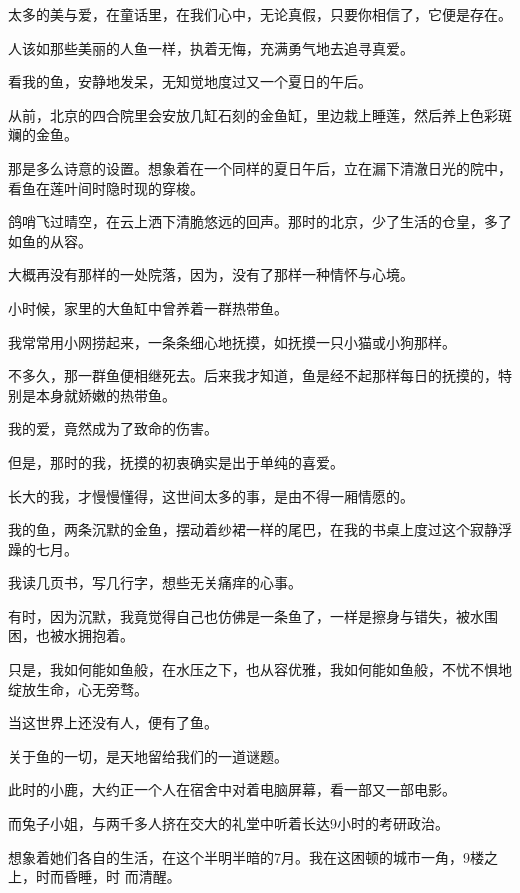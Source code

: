 \documentclass[12pt,a4paper]{article}
\def\blankrev{\vspace{1ex}}									%
\begin{document}
		\blankrev
		太多的美与爱，在童话里，在我们心中，无论真假，只要你相信了，它便是存在。\par
		人该如那些美丽的人鱼一样，执着无悔，充满勇气地去追寻真爱。

		\blankrev
		看我的鱼，安静地发呆，无知觉地度过又一个夏日的午后。\par
		从前，北京的四合院里会安放几缸石刻的金鱼缸，里边栽上睡莲，然后养上色彩斑斓的金鱼。\par
		那是多么诗意的设置。想象着在一个同样的夏日午后，立在漏下清澈日光的院中，看鱼在莲叶间时隐时现的穿梭。\par
		鸽哨飞过晴空，在云上洒下清脆悠远的回声。那时的北京，少了生活的仓皇，多了如鱼的从容。\par
		大概再没有那样的一处院落，因为，没有了那样一种情怀与心境。

		\blankrev
		小时候，家里的大鱼缸中曾养着一群热带鱼。\par
		我常常用小网捞起来，一条条细心地抚摸，如抚摸一只小猫或小狗那样。\par
		不多久，那一群鱼便相继死去。后来我才知道，鱼是经不起那样每日的抚摸的，特别是本身就娇嫩的热带鱼。

		\blankrev
		我的爱，竟然成为了致命的伤害。\par
		但是，那时的我，抚摸的初衷确实是出于单纯的喜爱。\par
		长大的我，才慢慢懂得，这世间太多的事，是由不得一厢情愿的。

		\blankrev
		我的鱼，两条沉默的金鱼，摆动着纱裙一样的尾巴，在我的书桌上度过这个寂静浮躁的七月。\par
		我读几页书，写几行字，想些无关痛痒的心事。\par
		有时，因为沉默，我竟觉得自己也仿佛是一条鱼了，一样是擦身与错失，被水围困，也被水拥抱着。\par
		只是，我如何能如鱼般，在水压之下，也从容优雅，我如何能如鱼般，不忧不惧地绽放生命，心无旁骛。

		\blankrev
		当这世界上还没有人，便有了鱼。\par
		关于鱼的一切，是天地留给我们的一道谜题。

	\endwriting



		此时的小鹿，大约正一个人在宿舍中对着电脑屏幕，看一部又一部电影。

		而兔子小姐，与两千多人挤在交大的礼堂中听着长达9小时的考研政治。

		想象着她们各自的生活，在这个半明半暗的7月。我在这困顿的城市一角，9楼之上，时而昏睡，时
	而清醒。
\end{document}

